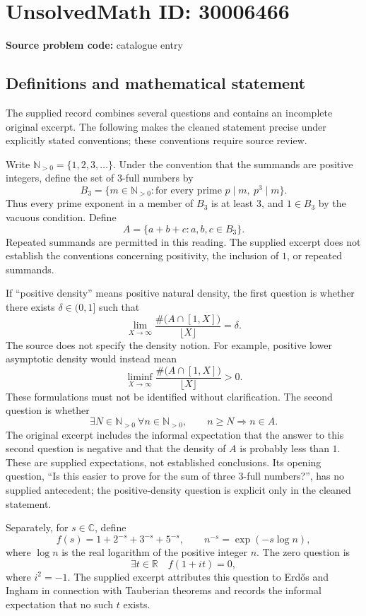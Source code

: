 \documentclass[11pt]{article}
\newcommand{\N}{\mathbb{N}}
\newcommand{\R}{\mathbb{R}}
\newcommand{\C}{\mathbb{C}}
\begin{document}
\section*{UnsolvedMath ID: 30006466}
\textbf{Source problem code:} catalogue entry
\subsection{Definitions and mathematical statement}
The supplied record combines several questions and contains an incomplete original excerpt. The following makes the cleaned statement precise under explicitly stated conventions; these conventions require source review.

Write \(\N_{>0}=\{1,2,3,\ldots\}\). Under the convention that the summands are positive integers, define the set of \(3\)-full numbers by
\[
B_3=\{m\in\N_{>0}: \text{for every prime }p\mid m,\ p^3\mid m\}.
\]
Thus every prime exponent in a member of \(B_3\) is at least \(3\), and \(1\in B_3\) by the vacuous condition. Define
\[
A=\{a+b+c:a,b,c\in B_3\}.
\]
Repeated summands are permitted in this reading. The supplied excerpt does not establish the conventions concerning positivity, the inclusion of \(1\), or repeated summands.

If ``positive density'' means positive natural density, the first question is whether there exists \(\delta\in(0,1]\) such that
\[
\lim_{X\to\infty}\frac{\#\bigl(A\cap[1,X]\bigr)}{\lfloor X\rfloor}=\delta.
\]
The source does not specify the density notion. For example, positive lower asymptotic density would instead mean
\[
\liminf_{X\to\infty}\frac{\#\bigl(A\cap[1,X]\bigr)}{\lfloor X\rfloor}>0.
\]
These formulations must not be identified without clarification. The second question is whether
\[
\exists N\in\N_{>0}\ \forall n\in\N_{>0},\qquad n\ge N\Longrightarrow n\in A.
\]
The original excerpt includes the informal expectation that the answer to this second question is negative and that the density of \(A\) is probably less than \(1\). These are supplied expectations, not established conclusions. Its opening question, ``Is this easier to prove for the sum of three 3-full numbers?'', has no supplied antecedent; the positive-density question is explicit only in the cleaned statement.

Separately, for \(s\in\C\), define
\[
f(s)=1+2^{-s}+3^{-s}+5^{-s},\qquad n^{-s}=\exp(-s\log n),
\]
where \(\log n\) is the real logarithm of the positive integer \(n\). The zero question is
\[
\exists t\in\R\quad f(1+it)=0,
\]
where \(i^2=-1\). The supplied excerpt attributes this question to Erd\H{o}s and Ingham in connection with Tauberian theorems and records the informal expectation that no such \(t\) exists.
\end{document}
